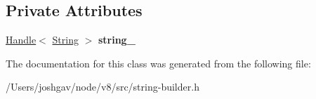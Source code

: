 \subsection*{Private Attributes}
\begin{DoxyCompactItemize}
\item 
\hyperlink{classv8_1_1internal_1_1_handle}{Handle}$<$ \hyperlink{classv8_1_1internal_1_1_string}{String} $>$ {\bfseries string\+\_\+}\hypertarget{classv8_1_1internal_1_1_incremental_string_builder_1_1_no_extend_string_ab0c3a2b3d3d820747c1f94b7356e0c74}{}\label{classv8_1_1internal_1_1_incremental_string_builder_1_1_no_extend_string_ab0c3a2b3d3d820747c1f94b7356e0c74}

\end{DoxyCompactItemize}


The documentation for this class was generated from the following file\+:\begin{DoxyCompactItemize}
\item 
/\+Users/joshgav/node/v8/src/string-\/builder.\+h\end{DoxyCompactItemize}
